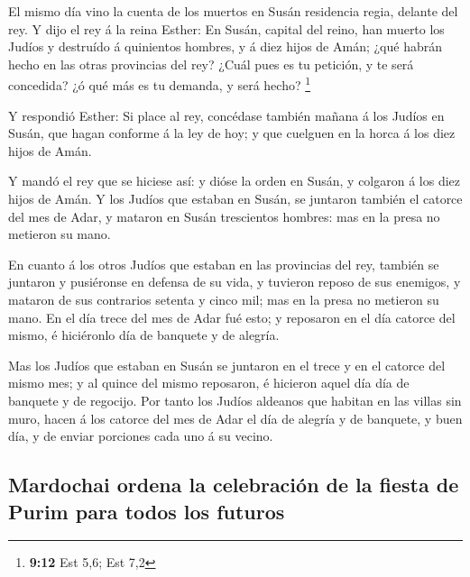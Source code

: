  El mismo día vino la cuenta de los muertos en Susán
residencia regia, delante del rey.  Y dijo el rey á la
reina Esther: En Susán, capital del reino, han muerto los Judíos y
destruído á quinientos hombres, y á diez hijos de Amán; ¿qué habrán
hecho en las otras provincias del rey? ¿Cuál pues es tu petición, y te
será concedida? ¿ó qué más es tu demanda, y será hecho? \footnote{\textbf{9:12}
  Est 5,6; Est 7,2}

 Y respondió Esther: Si place al rey, concédase también
mañana á los Judíos en Susán, que hagan conforme á la ley de hoy; y que
cuelguen en la horca á los diez hijos de Amán.

 Y mandó el rey que se hiciese así: y dióse la orden en
Susán, y colgaron á los diez hijos de Amán.  Y los Judíos
que estaban en Susán, se juntaron también el catorce del mes de Adar, y
mataron en Susán trescientos hombres: mas en la presa no metieron su
mano.

 En cuanto á los otros Judíos que estaban en las
provincias del rey, también se juntaron y pusiéronse en defensa de su
vida, y tuvieron reposo de sus enemigos, y mataron de sus contrarios
setenta y cinco mil; mas en la presa no metieron su mano.
 En el día trece del mes de Adar fué esto; y reposaron en
el día catorce del mismo, é hiciéronlo día de banquete y de alegría.

 Mas los Judíos que estaban en Susán se juntaron en el
trece y en el catorce del mismo mes; y al quince del mismo reposaron, é
hicieron aquel día día de banquete y de regocijo.  Por
tanto los Judíos aldeanos que habitan en las villas sin muro, hacen á
los catorce del mes de Adar el día de alegría y de banquete, y buen día,
y de enviar porciones cada uno á su vecino.

\hypertarget{mardochai-ordena-la-celebraciuxf3n-de-la-fiesta-de-purim-para-todos-los-futuros}{%
\subsection{Mardochai ordena la celebración de la fiesta de Purim para
todos los
futuros}\label{mardochai-ordena-la-celebraciuxf3n-de-la-fiesta-de-purim-para-todos-los-futuros}}

